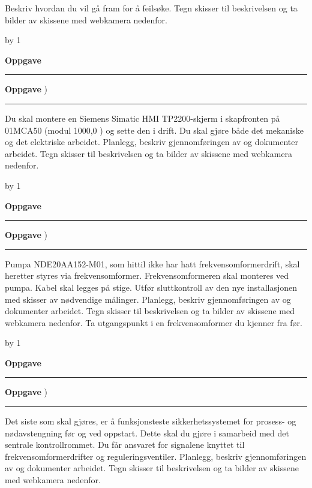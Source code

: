 \documentclass[12pt,a4paper]{article}
\def\oppgave{
            \advance\questnum by 1
	    \ifthenelse{\questnum>0\AND \questnum<9}
	    {
                \vskip 1cm
		\textbf{Oppgave}\hskip 5pt\the\questnum \hfill \hfill
		\vskip 3pt
		\hrule
	\vskip 0.5cm}
	{
                \vskip 1cm
		\textbf{Oppgave}\hskip 5pt \the\questnum \hfill \hfill)
		\vskip 3pt \hrule \vskip 0.5cm }

		}
\begin{document}
\vskip 0.25cm
Beskriv hvordan du vil gå fram for å feilsøke. Tegn skisser til beskrivelsen og ta bilder av skissene med webkamera nedenfor.
\vskip 0.25cm
\oppgave{}%
Du skal montere en Siemens Simatic HMI TP2200-skjerm i skapfronten på 01MCA50 (modul 1000,0 ) og sette den i drift. Du skal gjøre både det mekaniske og det elektriske arbeidet. 
\vskip 0.25cm
Planlegg, beskriv gjennomføringen av og dokumenter arbeidet. Tegn skisser til beskrivelsen og ta bilder av skissene med webkamera nedenfor.
\vskip 0.25cm
\oppgave{}%
Pumpa NDE20AA152-M01, som hittil ikke har hatt frekvensomformerdrift, skal heretter styres via frekvensomformer. Frekvensomformeren skal monteres ved pumpa. Kabel skal legges på stige. Utfør sluttkontroll av den nye installasjonen med skisser av nødvendige målinger. 
\vskip 0.25cm
Planlegg, beskriv gjennomføringen av og dokumenter arbeidet. Tegn skisser til beskrivelsen og ta bilder av skissene med webkamera nedenfor. Ta utgangspunkt i en frekvensomformer du kjenner fra før.
\vskip 0.25cm
\oppgave{}%
Det siste som skal gjøres, er å funksjonsteste sikkerhetssystemet for prosess- og nødavstengning før og ved oppstart. Dette skal du gjøre i samarbeid med det sentrale kontrollrommet. Du får ansvaret for signalene knyttet til frekvensomformerdrifter og reguleringsventiler. 
\vskip 0.25cm
Planlegg, beskriv gjennomføringen av og dokumenter arbeidet. Tegn skisser til beskrivelsen og ta bilder av skissene med webkamera nedenfor.
\vskip 0.25cm
\newpage
\end{document}
